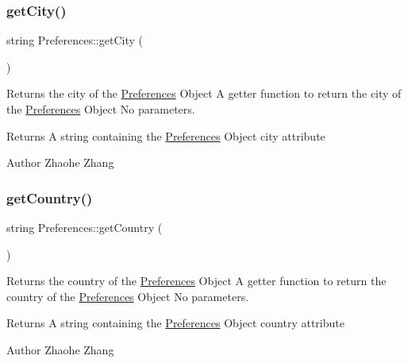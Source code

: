 \subsubsection{\texorpdfstring{get\+City()}{getCity()}}
{\footnotesize\ttfamily string Preferences\+::get\+City (\begin{DoxyParamCaption}{ }\end{DoxyParamCaption})}



Returns the city of the \mbox{\hyperlink{class_preferences}{Preferences}} Object  A getter function to return the city of the \mbox{\hyperlink{class_preferences}{Preferences}} Object  No parameters. 

\begin{DoxyReturn}{Returns}
A string containing the \mbox{\hyperlink{class_preferences}{Preferences}} Object city attribute 
\end{DoxyReturn}
\begin{DoxyAuthor}{Author}
Zhaohe Zhang 
\end{DoxyAuthor}
\mbox{\label{class_preferences_ac7df042c5760319cd884048c7f85c0e3}} 
\subsubsection{\texorpdfstring{get\+Country()}{getCountry()}}
{\footnotesize\ttfamily string Preferences\+::get\+Country (\begin{DoxyParamCaption}{ }\end{DoxyParamCaption})}



Returns the country of the \mbox{\hyperlink{class_preferences}{Preferences}} Object  A getter function to return the country of the \mbox{\hyperlink{class_preferences}{Preferences}} Object  No parameters. 

\begin{DoxyReturn}{Returns}
A string containing the \mbox{\hyperlink{class_preferences}{Preferences}} Object country attribute 
\end{DoxyReturn}
\begin{DoxyAuthor}{Author}
Zhaohe Zhang 
\end{DoxyAuthor}
\mbox{\label{class_preferences_afbdb72ac6c36492784e17b4d7e217ecc}} 
